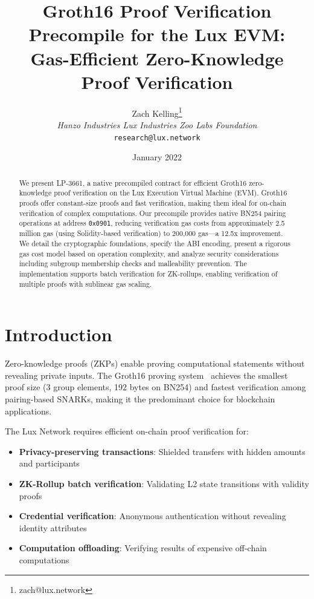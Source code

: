 \documentclass[11pt,a4paper]{article}
\title{Groth16 Proof Verification Precompile for the Lux EVM:\\Gas-Efficient Zero-Knowledge Proof Verification}
\author{Zach Kelling\thanks{zach@lux.network} \\ \textit{Hanzo Industries \quad Lux Industries \quad Zoo Labs Foundation} \\ \texttt{research@lux.network}}
\date{January 2022}
\theoremstyle{definition}
\begin{document}
\maketitle

\begin{abstract}
We present LP-3661, a native precompiled contract for efficient Groth16 zero-knowledge proof verification on the Lux Execution Virtual Machine (EVM). Groth16 proofs offer constant-size proofs and fast verification, making them ideal for on-chain verification of complex computations. Our precompile provides native BN254 pairing operations at address \texttt{0x0901}, reducing verification gas costs from approximately 2.5 million gas (using Solidity-based verification) to 200,000 gas---a 12.5x improvement. We detail the cryptographic foundations, specify the ABI encoding, present a rigorous gas cost model based on operation complexity, and analyze security considerations including subgroup membership checks and malleability prevention. The implementation supports batch verification for ZK-rollups, enabling verification of multiple proofs with sublinear gas scaling.
\end{abstract}

\section{Introduction}

Zero-knowledge proofs (ZKPs) enable proving computational statements without revealing private inputs. The Groth16 proving system~\cite{groth16} achieves the smallest proof size (3 group elements, 192 bytes on BN254) and fastest verification among pairing-based SNARKs, making it the predominant choice for blockchain applications.

The Lux Network requires efficient on-chain proof verification for:
\begin{itemize}
    \item \textbf{Privacy-preserving transactions}: Shielded transfers with hidden amounts and participants
    \item \textbf{ZK-Rollup batch verification}: Validating L2 state transitions with validity proofs
    \item \textbf{Credential verification}: Anonymous authentication without revealing identity attributes
    \item \textbf{Computation offloading}: Verifying results of expensive off-chain computations
\end{itemize}
\end{document}
